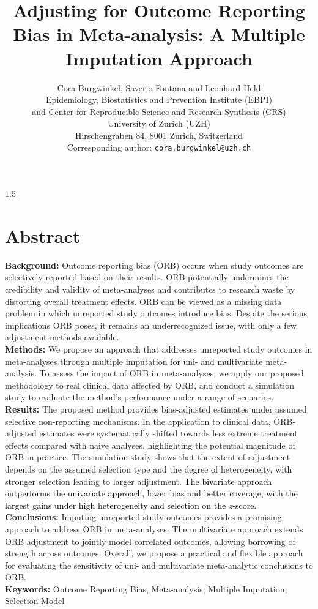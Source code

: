 \documentclass{article}
\title{\bf{Adjusting for Outcome Reporting Bias in Meta-analysis: A Multiple Imputation Approach}}
\author{Cora Burgwinkel, Saverio Fontana and Leonhard Held\\ 
  Epidemiology, Biostatistics
  and Prevention Institute (EBPI)\\ 
  and Center for Reproducible Science and Research Synthesis (CRS) \\
  University of Zurich (UZH)\\ Hirschengraben 84,
  8001 Zurich, Switzerland\\ Corresponding author: \texttt{cora.burgwinkel@uzh.ch}}
\date{}
\newcommand{\mycolor}[1]{\textcolor{black}{#1}}
\begin{document}
\begin{spacing}{1.5}

\maketitle
\linenumbers
\section*{Abstract}

\textbf{Background:} Outcome reporting bias (ORB) occurs when study outcomes are selectively reported based on their results. ORB potentially undermines the credibility and validity of meta-analyses and contributes to research waste by distorting overall treatment effects. ORB can be viewed as a missing data problem in which unreported study outcomes introduce bias. Despite the serious implications ORB poses, it remains an underrecognized issue, with only a few adjustment methods available.\\[.25cm]
\noindent
\textbf{Methods:} We propose an approach that addresses unreported study outcomes in meta-analyses through multiple imputation for uni- and multivariate meta-analysis. To assess the impact of ORB in meta-analyses, we apply our proposed methodology to real clinical data affected by ORB, and conduct a simulation study to evaluate the method's performance under a range of scenarios.\\[.25cm]
\noindent
\textbf{Results:} The proposed method provides bias-adjusted estimates under assumed selective non-reporting mechanisms. In the application to clinical data, ORB-adjusted estimates were systematically shifted towards less extreme treatment effects compared with naive analyses, highlighting the potential magnitude of ORB in practice. The simulation study shows that the extent of adjustment depends on the assumed selection type and the degree of heterogeneity, with stronger selection leading to larger adjustment. \mycolor{The bivariate approach outperforms the univariate approach, \ie lower bias and better coverage, with the largest gains under high heterogeneity and selection on the $z$-score.}\\[.25cm]
\noindent
\textbf{Conclusions:} Imputing unreported study outcomes provides a promising approach to address ORB in meta-analyses. The multivariate approach extends ORB adjustment to jointly model correlated outcomes, allowing borrowing of strength across outcomes. Overall, we propose a practical and flexible approach for evaluating the sensitivity of uni- and multivariate meta-analytic conclusions to ORB.\\[.25cm]
\noindent
\textbf{Keywords:} Outcome Reporting Bias, Meta-analysis, Multiple Imputation, Selection Model


\end{spacing}
\end{document}
